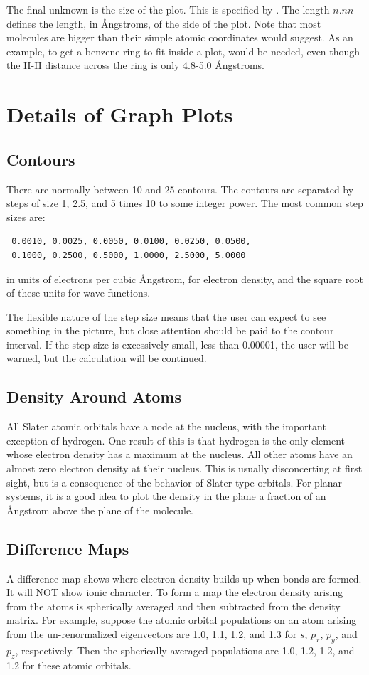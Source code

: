 The final unknown is the size of the plot. This is
specified by .
The length $n.nn$ defines the length, in \AA ngstroms, of the side of the plot.
Note that most molecules are bigger than their simple atomic coordinates
would suggest. As an example, to get a benzene ring to fit inside a plot,
 would be needed, even though the H-H distance across the ring is
only 4.8-5.0 \AA ngstroms.
\section{Details of Graph Plots}
\subsection{Contours}
 There are normally between 10 and 25 contours. The contours are separated
by steps of size 1, 2.5, and 5 times 10 to some integer power. The most
common step sizes are:
\begin{verbatim}
 0.0010, 0.0025, 0.0050, 0.0100, 0.0250, 0.0500,
 0.1000, 0.2500, 0.5000, 1.0000, 2.5000, 5.0000
\end{verbatim}
in units of electrons per cubic \AA ngstrom, for electron density, and
the square root of these units for wave-functions.

 The flexible nature of the step size means that the user can expect to see
something in the picture, but close attention should be paid to the contour
interval. If the step size is excessively small, less than 0.00001,
the user will be warned, but the calculation will be continued.

\subsection{Density Around Atoms}
 All Slater atomic orbitals have a node at the nucleus, with the
important exception
of hydrogen. One result of this is that hydrogen is the only element whose
electron density has a maximum at the nucleus. All other atoms have an almost
zero electron density at their nucleus. This is usually disconcerting
at first sight,
but is a consequence of the behavior of Slater-type orbitals.
 For planar systems, it is a good idea to plot the density in the plane
a fraction of an \AA ngstrom above the plane of the molecule.
\subsection{Difference Maps}
 A difference map shows where electron density builds up when bonds are
formed. It will NOT show ionic character. To form a  map
the electron density arising from the atoms is spherically averaged and
then subtracted from the density matrix. For example, suppose the atomic
orbital populations on an atom arising from the un-renormalized eigenvectors
are  1.0, 1.1, 1.2, and 1.3 for $s$, $p_x$, $p_y$, and $p_z$,
respectively. Then the
spherically averaged populations are 1.0, 1.2, 1.2, and 1.2 for these atomic
orbitals.
